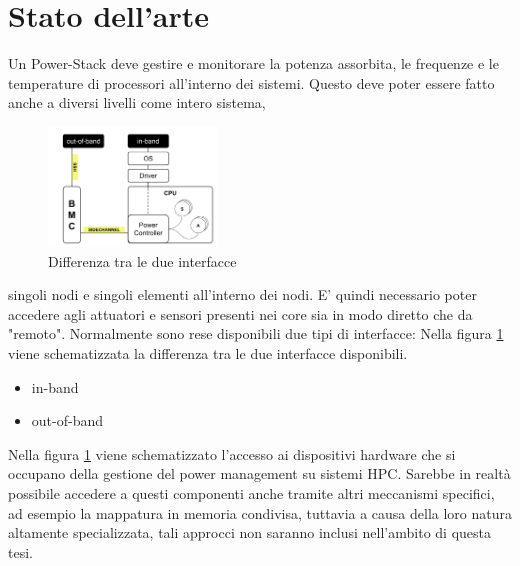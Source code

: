 \section{Stato dell'arte}
Un Power-Stack deve gestire e monitorare la potenza assorbita, le frequenze e le temperature di processori all'interno dei sistemi. Questo deve poter essere fatto anche a diversi livelli come intero sistema,
\setlength{\intextsep}{1pt} %
\begin{figure}
    \includegraphics[width=0.4\textwidth]{img/SoA.png}
    \centering
    \caption{Differenza tra le due interfacce} 
    \label{fig:SoAinoutband}
\end{figure}
singoli nodi e singoli elementi all'interno dei nodi. E' quindi necessario poter accedere agli attuatori e sensori presenti nei core sia in modo diretto che da "remoto". Normalmente sono rese disponibili due tipi di interfacce:
Nella figura \ref{fig:SoAinoutband} viene schematizzata la differenza tra le due interfacce disponibili. 
\begin{itemize}
    \item in-band
    \item out-of-band
\end{itemize}
Nella figura \ref{fig:SoAinoutband} viene schematizzato l'accesso ai dispositivi hardware che si occupano della gestione del power management su sistemi HPC. Sarebbe in realtà possibile accedere a questi componenti anche tramite altri meccanismi specifici, ad esempio la mappatura in memoria condivisa, tuttavia a causa della loro natura altamente specializzata, tali approcci non saranno inclusi nell'ambito di questa tesi.


